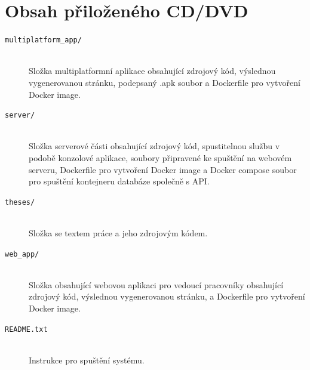 \documentclass[
  glossaries,
]{kidiplom}
\begin{document}
\section{Obsah přiloženého CD/DVD} \label{sec:ObsahCD}
\begin{description}

\item[\texttt{multiplatform\_app/}] \hfill \\
 Složka multiplatformní aplikace obsahující zdrojový kód, výslednou vygenerovanou stránku, podepsaný .apk soubor a Dockerfile pro vytvoření Docker image.

\item[\texttt{server/}] \hfill \\
   Složka serverové části obsahující zdrojový kód, spustitelnou službu v podobě konzolové aplikace, soubory připravené ke spuštění na webovém serveru,  Dockerfile pro vytvoření Docker image a Docker compose soubor pro spuštění kontejneru databáze společně s API.
   
\item[\texttt{theses/}] \hfill \\
Složka se textem práce a jeho zdrojovým kódem.


\item[\texttt{web\_app/}] \hfill \\
 Složka obsahující webovou aplikaci pro vedoucí pracovníky obsahující zdrojový kód, výslednou vygenerovanou stránku, a Dockerfile pro vytvoření Docker image.

\item[\texttt{README.txt}] \hfill \\
  Instrukce pro spuštění systému.
 

\end{description}
\end{document}
